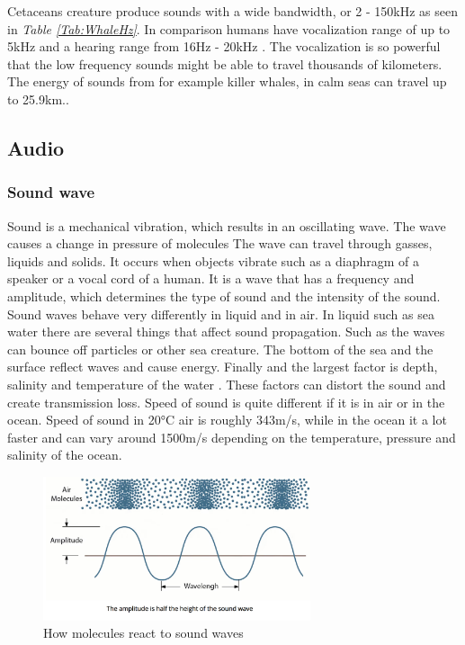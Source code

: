 Cetaceans creature produce sounds with a wide bandwidth, or 2 - 150kHz as seen in \textit{Table \ref{Tab:WhaleHz}}.
In comparison humans have vocalization range of up to 5kHz and a hearing range from 16Hz - 20kHz \cite{monson_perceptual_2014}.
The vocalization is so powerful that the low frequency sounds might be able to travel thousands of kilometers\cite{nowacek_studying_2016}.
The energy of sounds from for example killer whales, in calm seas can travel up to 25.9km.\cite{miller_diversity_2006}.

\newpage

\subsection{Audio}

\subsubsection{Sound wave}

Sound is a mechanical vibration, which results in an oscillating wave.
The wave causes a change in pressure of molecules 
The wave can travel through gasses, liquids and solids.
It occurs when objects vibrate such as a diaphragm of a speaker or a vocal cord of a human.
It is a wave that has a frequency and amplitude, which determines the type of sound and the intensity of the sound.
Sound waves behave very differently in liquid and in air.
In liquid such as sea water there are several things that affect sound propagation.
Such as the waves can bounce off particles or other sea creature. 
The bottom of the sea and the surface reflect waves and cause energy.
Finally and the largest factor  is depth, salinity and temperature of the water .
These factors can distort the sound and create transmission loss\cite{noauthor_sonar_nodate}.
Speed of sound is quite different if it is in air or in the ocean.
Speed of sound in 20°C air is roughly 343m/s, while  in the ocean it a lot faster and can vary around 1500m/s depending on the temperature, pressure and salinity of the ocean. 

\begin{figure}[h]
    \centering
    \includegraphics[width=0.70\textwidth]{graphics/soundwaves.png}
    \caption{How molecules react to sound waves \cite{noauthor_what_nodate}}
    \label{fig:SoundWaves}
\end{figure}

